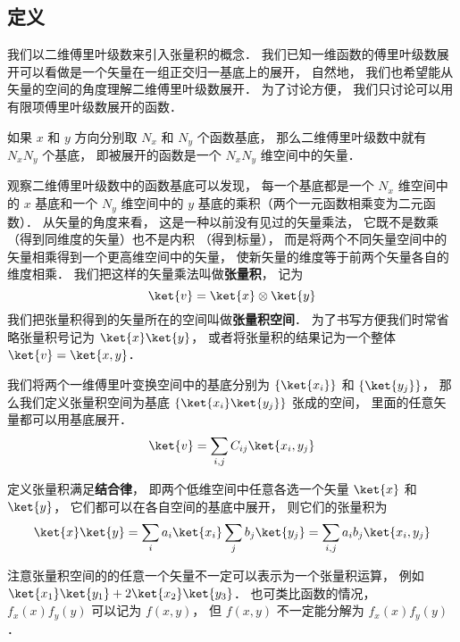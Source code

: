 

\subsection{定义}

我们以二维傅里叶级数来引入张量积的概念． 我们已知一维函数的傅里叶级数展开可以看做是一个矢量在一组正交归一基底上的展开， 自然地， 我们也希望能从矢量的空间的角度理解二维傅里叶级数展开． 为了讨论方便， 我们只讨论可以用有限项傅里叶级数展开的函数．

如果 $x$ 和 $y$ 方向分别取 $N_x$ 和 $N_y$ 个函数基底， 那么二维傅里叶级数中就有 $N_xN_y$ 个基底， 即被展开的函数是一个 $N_xN_y$ 维空间中的矢量．

观察二维傅里叶级数中的函数基底可以发现， 每一个基底都是一个 $N_x$ 维空间中的 $x$ 基底和一个 $N_y$ 维空间中的 $y$ 基底的乘积（两个一元函数相乘变为二元函数）． 从矢量的角度来看， 这是一种以前没有见过的矢量乘法， 它既不是数乘%
（得到同维度的矢量）也不是内积%
（得到标量）， 而是将两个不同矢量空间中的矢量相乘得到一个更高维空间中的矢量， 使新矢量的维度等于前两个矢量各自的维度相乘． 我们把这样的矢量乘法叫做\textbf{张量积}， 记为
\begin{equation}
\ket{v} = \ket{x} \otimes \ket{y}
\end{equation}
我们把张量积得到的矢量所在的空间叫做\textbf{张量积空间}． 为了书写方便我们时常省略张量积号记为 $\ket{x}\ket{y}$， 或者将张量积的结果记为一个整体 $\ket{v} = \ket{x, y}$．

我们将两个一维傅里叶变换空间中的基底分别为 $\{\ket{x_i}\}$ 和 $\{\ket{y_j}\}$， 那么我们定义张量积空间为基底 $\{\ket{x_i}\ket{y_j}\}$ 张成的空间， 里面的任意矢量都可以用基底展开．
\begin{equation}
\ket{v} = \sum_{i,j} C_{ij}\ket{x_i, y_j}
\end{equation}

定义张量积满足\textbf{结合律}， 即两个低维空间中任意各选一个矢量 $\ket{x}$ 和 $\ket{y}$， 它们都可以在各自空间的基底中展开， 则它们的张量积为
\begin{equation}\label{DirPro_eq2}
\ket{x}\ket{y} = \sum_i a_i\ket{x_i} \sum_j b_j\ket{y_j}
= \sum_{i,j} a_i b_j \ket{x_i, y_j}
\end{equation}

注意张量积空间的的任意一个矢量不一定可以表示为一个张量积运算， 例如 $\ket{x_1}\ket{y_1} + 2\ket{x_2}\ket{y_3}$． 也可类比函数的情况， $f_x(x)f_y(y)$ 可以记为 $f(x, y)$， 但 $f(x, y)$ 不一定能分解为 $f_x(x)f_y(y)$．

